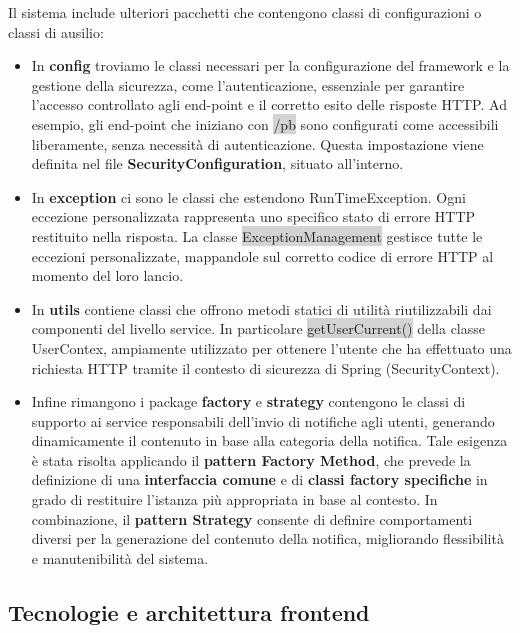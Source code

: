 
Il sistema include ulteriori pacchetti che contengono classi di configurazioni o classi di ausilio: 

\begin{itemize}
	
	\item In \textbf{config} troviamo le classi necessari per la configurazione del framework e la gestione della sicurezza, come l’autenticazione, essenziale per garantire l’accesso controllato agli end-point e il corretto esito delle risposte
	HTTP. Ad esempio, gli end-point che iniziano con \colorbox{lightgray}{/pb} sono configurati come accessibili liberamente, senza necessità di autenticazione. Questa impostazione viene definita nel file \textbf{SecurityConfiguration}, situato all’interno.
	
	\item In \textbf{exception} ci sono le classi che estendono RunTimeException.
	Ogni eccezione personalizzata rappresenta uno specifico stato di errore HTTP restituito nella risposta. La classe \colorbox{lightgray}{ExceptionManagement} gestisce tutte le eccezioni personalizzate, mappandole sul corretto codice di errore HTTP al momento del loro lancio.
	
	\item In \textbf{utils} contiene classi che offrono metodi statici di utilità riutilizzabili dai componenti del livello service. 
	In particolare \colorbox{lightgray}{getUserCurrent()} della classe UserContex, ampiamente utilizzato per ottenere l’utente che ha effettuato una richiesta HTTP tramite il contesto di sicurezza di Spring (SecurityContext).
	
	\item Infine rimangono i package \textbf{factory} e \textbf{strategy} contengono le classi di supporto ai service responsabili dell’invio di notifiche agli utenti, generando dinamicamente il contenuto in base alla categoria della notifica. Tale esigenza è stata risolta applicando il \textbf{pattern Factory Method}, che prevede la definizione di una \textbf{interfaccia comune} e di \textbf{classi factory specifiche} in grado di restituire l’istanza più appropriata in base al contesto.
	In combinazione, il \textbf{pattern Strategy} consente di definire comportamenti diversi per la generazione del contenuto della notifica, migliorando flessibilità e manutenibilità del sistema.
	
\end{itemize}
 
\subsection{Tecnologie e architettura frontend}

